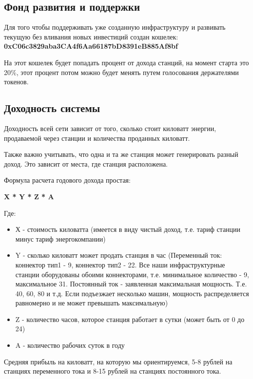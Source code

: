 \documentclass[a4paper,12pt]{report}
\begin{document}
\subsection{Фонд развития и поддержки}
Для того чтобы поддерживать уже созданную инфраструктуру и развивать текущую без вливания новых инвестиций создан кошелек: 
\textbf{0xC06c3829aba3CA4f6Aa66187bD8391eB885Af8bf}

На этот кошелек будет попадать процент от дохода станций, на момент старта это 20\%, этот процент потом можно будет менять путем голосования держателями токенов. 


\subsection{Доходность системы }
\label{capital}

Доходность всей сети зависит от того, сколько стоит киловатт энергии, продаваемой через станции и количества проданных киловатт. 

Также важно учитывать, что одна и та же станция может генерировать разный доход. Это зависит от места, где станция расположена.

Формула расчета годового дохода простая:


\textbf{X * Y * Z * A} 

Где:

\begin{itemize}
  \item Х - стоимость киловатта (имеется в виду чистый доход, т.е. тариф станции минус тариф энергокомпании)
  \item Y - сколько киловатт может продать станция в час (Переменный ток: коннектор тип1 - 9, коннектор тип2 - 22. Все наши инфраструктурные станции оборудованы обоими коннекторами, т.е. минимальное  количество - 9, максимальное 31. Постоянный ток - заявленная максимальная мощность. Т.е. 40, 60, 80 и т.д. Если подъезжает несколько машин, мощность распределяется равномерно и не может превышать максимальную)

\item Z - количество часов, которое станция работает в сутки (может быть от 0 до 24)
\item A - количество рабочих суток в году

\end{itemize}

Средняя прибыль на киловатт, на которую мы ориентируемся,  5-8 рублей на станциях переменного тока и 8-15 рублей на станциях постоянного тока. 
\end{document}

